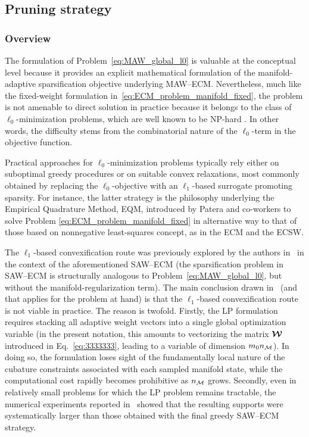 \documentclass[11pt,a4paper]{article}
\newcommand{\PROMPT}[1]{ }
\begin{document}
\subsection{Pruning strategy}

\subsubsection{Overview}

\PROMPT{}

%

The formulation of Problem~\eqref{eq:MAW_global_l0} is valuable at the conceptual level because it
provides an explicit mathematical formulation of the manifold-adaptive
sparsification objective underlying MAW--ECM.  Nevertheless, much like the fixed-weight formulation
in~\eqref{eq:ECM_problem_manifold_fixed}, the problem is not amenable to direct
solution in practice because it belongs to the class of
\(\ell_0\)-minimization problems, which are well known to be NP-hard
\cite{natarajan1995sparse}. In other words, the difficulty stems from the
combinatorial nature of the \(\ell_0\)-term in the objective function.




Practical approaches for \(\ell_0\)-minimization problems typically rely either on suboptimal greedy
procedures or on suitable convex relaxations, most commonly obtained by
replacing the \(\ell_0\)-objective with an \(\ell_1\)-based surrogate
promoting sparsity. For instance,  the latter strategy is   the philosophy underlying the Empirical Quadrature Method, EQM, introduced by Patera and co-workers
\cite{yano2019discontinuous,yano2019lp} to solve Problem   \eqref{eq:ECM_problem_manifold_fixed} in alternative way to that of those based on nonnegative least-squares concept, as in the ECM  and the ECSW.


\PROMPT{}

%
%
The \(\ell_1\)-based convexification route was previously explored by the
authors in~\cite{bravo2024subspace} in the context of the aforementioned
SAW--ECM (the sparsification problem  in SAW--ECM is structurally
analogous to Problem~\eqref{eq:MAW_global_l0}, but without the
manifold-regularization term). The main
conclusion drawn in~\cite{bravo2024subspace} (and that applies for the problem at hand) is that the \(\ell_1\)-based
convexification route is not viable in practice. The reason is twofold. Firstly, the LP formulation requires stacking all
adaptive weight vectors into a single global optimization variable (in the
present notation, this amounts to vectorizing the matrix \(\boldsymbol{\mathcal{W}}\) introduced
in Eq.~\eqref{eq:3333333}, leading to a variable of dimension \(m_0n_{\mathcal{M}}\)). In
doing so, the formulation loses sight of the fundamentally local nature of the
cubature constraints associated with each sampled manifold state, while the
computational cost rapidly becomes prohibitive as \(n_{\mathcal{M}}\) grows. Secondly,
even in relatively small problems for which the LP problem remains tractable,
the numerical experiments reported in~\cite{bravo2024subspace} showed that the
resulting supports were systematically larger than those obtained with the
final greedy SAW--ECM strategy.
\end{document}

